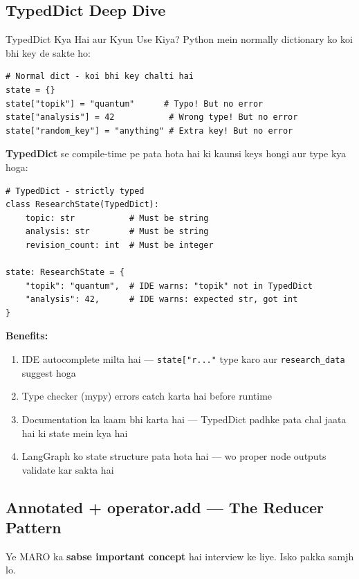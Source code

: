 \documentclass[11pt,a4paper,twoside]{report}
\begin{document}
\subsection{TypedDict Deep Dive}

\begin{conceptbox}{TypedDict Kya Hai aur Kyun Use Kiya?}
Python mein normally dictionary ko koi bhi key de sakte ho:
\begin{lstlisting}[style=pythonstyle]
# Normal dict - koi bhi key chalti hai
state = {}
state["topik"] = "quantum"      # Typo! But no error
state["analysis"] = 42           # Wrong type! But no error
state["random_key"] = "anything" # Extra key! But no error
\end{lstlisting}

\textbf{TypedDict} se compile-time pe pata hota hai ki kaunsi keys hongi aur type kya hoga:
\begin{lstlisting}[style=pythonstyle]
# TypedDict - strictly typed
class ResearchState(TypedDict):
    topic: str           # Must be string
    analysis: str        # Must be string
    revision_count: int  # Must be integer

state: ResearchState = {
    "topik": "quantum",  # IDE warns: "topik" not in TypedDict
    "analysis": 42,      # IDE warns: expected str, got int
}
\end{lstlisting}

\textbf{Benefits:}
\begin{enumerate}
    \item IDE autocomplete milta hai --- \texttt{state["r..."} type karo aur \texttt{research\_data} suggest hoga
    \item Type checker (mypy) errors catch karta hai before runtime
    \item Documentation ka kaam bhi karta hai --- TypedDict padhke pata chal jaata hai ki state mein kya hai
    \item LangGraph ko state structure pata hota hai --- wo proper node outputs validate kar sakta hai
\end{enumerate}
\end{conceptbox}

\subsection{Annotated + operator.add --- The Reducer Pattern}

Ye MARO ka \textbf{sabse important concept} hai interview ke liye. Isko pakka samjh lo.
\end{document}

